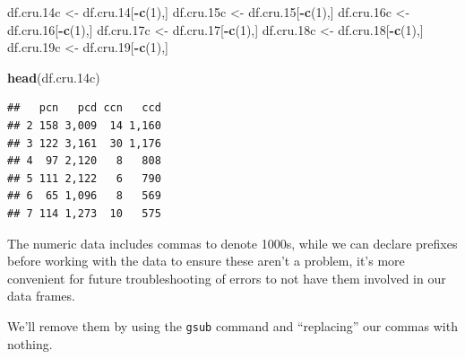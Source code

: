 \documentclass[
  11,
]{book}
\newenvironment{Shaded}{\begin{snugshade}}{\end{snugshade}}
\newcommand{\DecValTok}[1]{\textcolor[rgb]{0.06,0.06,0.06}{#1}}
\newcommand{\FloatTok}[1]{\textcolor[rgb]{0.06,0.06,0.06}{#1}}
\newcommand{\FunctionTok}[1]{\textcolor[rgb]{0.27,0.27,0.27}{\textbf{#1}}}
\newcommand{\NormalTok}[1]{#1}
\newcommand{\OtherTok}[1]{\textcolor[rgb]{0.37,0.37,0.37}{#1}}
\newcommand{\SpecialCharTok}[1]{\textcolor[rgb]{0.43,0.43,0.43}{\textbf{#1}}}
\begin{document}
\begin{Shaded}
\begin{Highlighting}[]
\NormalTok{df.cru}\FloatTok{.14}\NormalTok{c }\OtherTok{\textless{}{-}}\NormalTok{ df.cru}\FloatTok{.14}\NormalTok{[}\SpecialCharTok{{-}}\FunctionTok{c}\NormalTok{(}\DecValTok{1}\NormalTok{),]}
\NormalTok{df.cru}\FloatTok{.15}\NormalTok{c }\OtherTok{\textless{}{-}}\NormalTok{ df.cru}\FloatTok{.15}\NormalTok{[}\SpecialCharTok{{-}}\FunctionTok{c}\NormalTok{(}\DecValTok{1}\NormalTok{),]}
\NormalTok{df.cru}\FloatTok{.16}\NormalTok{c }\OtherTok{\textless{}{-}}\NormalTok{ df.cru}\FloatTok{.16}\NormalTok{[}\SpecialCharTok{{-}}\FunctionTok{c}\NormalTok{(}\DecValTok{1}\NormalTok{),]}
\NormalTok{df.cru}\FloatTok{.17}\NormalTok{c }\OtherTok{\textless{}{-}}\NormalTok{ df.cru}\FloatTok{.17}\NormalTok{[}\SpecialCharTok{{-}}\FunctionTok{c}\NormalTok{(}\DecValTok{1}\NormalTok{),]}
\NormalTok{df.cru}\FloatTok{.18}\NormalTok{c }\OtherTok{\textless{}{-}}\NormalTok{ df.cru}\FloatTok{.18}\NormalTok{[}\SpecialCharTok{{-}}\FunctionTok{c}\NormalTok{(}\DecValTok{1}\NormalTok{),]}
\NormalTok{df.cru}\FloatTok{.19}\NormalTok{c }\OtherTok{\textless{}{-}}\NormalTok{ df.cru}\FloatTok{.19}\NormalTok{[}\SpecialCharTok{{-}}\FunctionTok{c}\NormalTok{(}\DecValTok{1}\NormalTok{),]}

\FunctionTok{head}\NormalTok{(df.cru}\FloatTok{.14}\NormalTok{c)}
\end{Highlighting}
\end{Shaded}

\begin{verbatim}
##   pcn   pcd ccn   ccd
## 2 158 3,009  14 1,160
## 3 122 3,161  30 1,176
## 4  97 2,120   8   808
## 5 111 2,122   6   790
## 6  65 1,096   8   569
## 7 114 1,273  10   575
\end{verbatim}

The numeric data includes commas to denote 1000s, while we can declare prefixes before working with the data to ensure these aren't a problem, it's more convenient for future troubleshooting of errors to not have them involved in our data frames.

We'll remove them by using the \texttt{gsub} command and ``replacing'' our commas with nothing.
\end{document}
